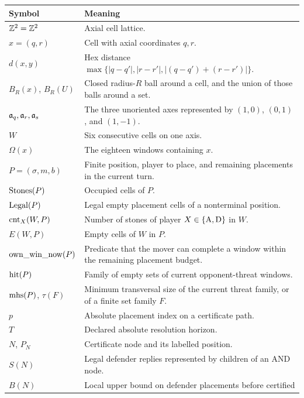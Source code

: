 \begin{appendixtable}
  \label{tab:notation-game}
  \small
  \renewcommand{\arraystretch}{1.08}
  \begin{tabular}{@{}p{}p{}@{}}
    \toprule
    Symbol & Meaning \\
    \midrule
    $\mathbb{Z}^{2}=\mathbb Z^2$ & Axial cell lattice. \\
    $x=(q,r)$ & Cell with axial coordinates $q,r$. \\
    $d(x,y)$ & Hex distance
      $\max\{|q-q'|,|r-r'|,|(q-q')+(r-r')|\}$. \\
    $B_R(x)$, $B_R(U)$ & Closed radius-$R$ ball around a cell, and the union
      of those balls around a set. \\
    $\mathfrak a_q,\mathfrak a_r,\mathfrak a_s$ & The three unoriented axes represented by
      $(1,0)$, $(0,1)$, and $(1,-1)$. \\
    $W$ & Six consecutive cells on one axis. \\
    $\Omega(x)$ & The eighteen windows containing $x$. \\
    $P=(\sigma,m,b)$ & Finite position, player to place, and remaining
      placements in the current turn. \\
    $\operatorname{Stones}(P)$ & Occupied cells of $P$. \\
    $\operatorname{Legal}(P)$ & Legal empty placement cells of a nonterminal position. \\
    $\operatorname{cnt}_X(W,P)$ & Number of stones of player $X\in\{\mathrm{A},\mathrm{D}\}$ in $W$. \\
    $E(W,P)$ & Empty cells of $W$ in $P$. \\
    $\operatorname{own\_win\_now}(P)$ & Predicate that the mover can complete a window within
      the remaining placement budget. \\
    $\operatorname{hit}(P)$ & Family of empty sets of current opponent-threat windows. \\
    $\operatorname{mhs}(P)$, $\tau(F)$ & Minimum transversal size of the current threat
      family, or of a finite set family $F$. \\
    $p$ & Absolute placement index on a certificate path. \\
    $T$ & Declared absolute resolution horizon. \\
    $N$, $P_N$ & Certificate node and its labelled position. \\
    $S(N)$ & Legal defender replies represented by children of an AND node. \\
    $B(N)$ & Local upper bound on defender placements before certified

\end{tabular}
\end{appendixtable}
